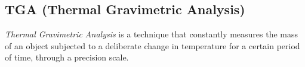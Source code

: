 \documentclass{article}
\begin{document}
                \begin{table}[h!]
                    \caption{Results of the DSC analysis showcasing phase transition points, enthalpies and crystallinity of the material}
                    \label{tab:DSC_Results}
                \end{table}

        \clearpage
        \subsection{TGA (Thermal Gravimetric Analysis)\label{TGA_Analysis}}
        
        \textit{Thermal Gravimetric Analysis} is a technique that constantly measures the mass of an object subjected to a deliberate 
        change in temperature for a certain period of time, through a precision scale. 
\end{document}
